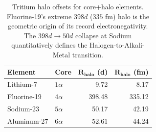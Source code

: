 \begin{table}[htbp]
    \centering
    \begin{tabular}{l l r r}
    \hline\hline
    \textbf{Element} & \textbf{Core} & $\mathbf{R_{\text{halo}}}$ \textbf{(d)} & $\mathbf{R_{\text{halo}}}$ \textbf{(fm)} \\
    \hline
    Lithium-7    & $1\alpha$  &    9.72 &    8.17 \\
    Fluorine-19  & $4\alpha$  &  398.48 &  335.12 \\
    Sodium-23    & $5\alpha$  &   50.17 &   42.19 \\
    Aluminum-27  & $6\alpha$  &   52.61 &   44.24 \\
    \hline\hline
    \end{tabular}
    \caption{Tritium halo offsets for core+halo elements. Fluorine-19's extreme $398d$ ($335$ fm) halo is the geometric origin of its record electronegativity. The $398d \to 50d$ collapse at Sodium quantitatively defines the Halogen-to-Alkali-Metal transition.}
    \label{tab:halo_summary}
\end{table}
